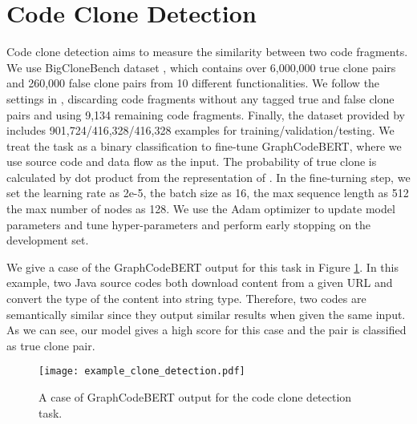 \documentclass{article} \usepackage{iclr2021_conference,times}
\begin{document}
\section{Code Clone Detection}
Code clone detection aims to measure the similarity between two code fragments. We use BigCloneBench dataset \citep{svajlenko2014towards}, which contains over 6,000,000 true clone pairs and 260,000 false clone pairs from 10 different functionalities. We follow the settings in \citet{wei2017supervised}, discarding code fragments without any tagged true and false clone pairs and using 9,134 remaining code fragments. Finally, the dataset provided by \citet{wang2020detecting} includes 901,724/416,328/416,328 examples for training/validation/testing.
We treat the task as a binary classification to fine-tune GraphCodeBERT, where we use source code and data flow as the input. The probability of true clone is calculated by dot product from the representation of .  In the fine-turning step, we set the learning rate as 2e-5, the batch size as 16, the max sequence length as 512 the max number of nodes as 128. We use the Adam optimizer to update model parameters and tune hyper-parameters and perform early stopping on the development set.

We give a case of the GraphCodeBERT output for this task in Figure \ref{example_clone_detection}. In this example, two Java source codes both download content from a given URL and convert the type of the content into string type. Therefore, two codes are semantically similar since they output similar results when given the same input. As we can see, our model gives a high score for this case and the pair is classified as true clone pair.
\begin{figure}[h]
\begin{center}
		\texttt{[image: example\_clone\_detection.pdf]}
		\caption{A case of GraphCodeBERT output for the code clone detection task. }
		\label{example_clone_detection}
	\end{center}
	
\end{figure}
\end{document}

